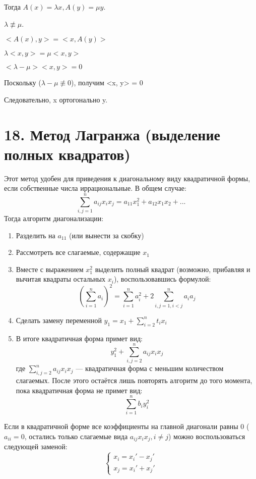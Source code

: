 \documentclass[12pt]{article}
\begin{document}
    Тогда $A(x) = \lambda x, A(y) = \mu y$.

$\lambda \not \equiv \mu$.

$<A(x), y> = <x, A(y)>$

$\lambda <x, y> = \mu <x, y>$

$<\lambda - \mu><x, y> = 0$

    Поскольку ($\lambda - \mu \not\equiv 0$), получим <x, y> = 0

Следовательно, x ортогонально y.

\section{18. Метод Лагранжа (выделение полных квадратов)}
Этот метод удобен для приведения к диагональному виду квадратичной формы, если собственные числа иррациональные. В общем случае:
\[
    \sum_{i,j=1}^n a_{ij}x_ix_j = a_{11}x_1^2 + a_{12}x_1x_2 + ...
\]
Тогда алгоритм диагонализации:
\begin{enumerate}
    \item Разделить на $a_{11}$ (или вынести за скобку)
    \item Рассмотреть все слагаемые, содержащие $x_1$
    \item Вместе с выражением $x_1^2$ выделить полный квадрат (возможно, прибавляя и вычитая квадраты остальных $x_i$), воспользовавшись формулой:
          \[
              (\sum_{i = 1}^n a_i)^2 = \sum_{i = 1}^na_i^2 + 2\sum_{i,j=1, i<j}^na_ia_j
          \]
    \item Сделать замену переменной $\displaystyle y_1 = x_1 + \sum_{i=2}^nt_ix_i$
    \item В итоге квадратичная форма примет вид:
          \[
              y_1^2 + \sum_{i,j=2}^na_{ij}x_ix_j
          \]
          где $\displaystyle \sum_{i,j=2}^na_{ij}x_ix_j$ — квадратичная форма с меньшим количеством слагаемых. После этого остаётся лишь повторять алгоритм до того момента, пока квадратичная форма не примет вид:
          \[
              \sum_{i=1}^nb_iy_i^2
          \]
\end{enumerate}

Если в квадратичной форме все коэффициенты на главной диагонали равны $0$ ($a_{ii} = 0$, остались только слагаемые вида $a_{ij}x_ix_j, i \neq j$) можно воспользоваться следующей заменой:
\[
    \begin{cases}
        x_i = x_i' - x_j' \\
        x_j = x_i' + x_j'
    \end{cases}
\]
\end{document}
